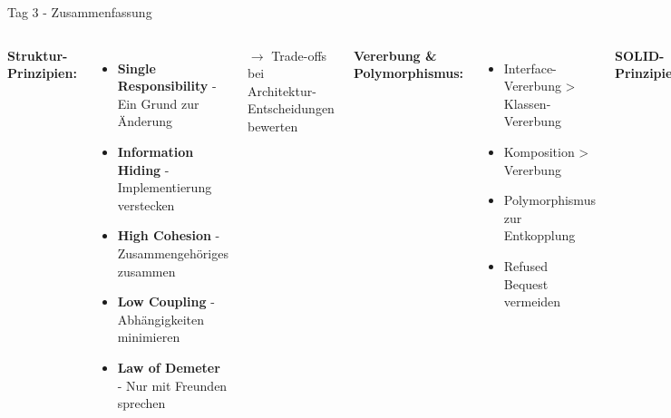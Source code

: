 \begin{frame}{Tag 3 - Zusammenfassung}
  \footnotesize
  \begin{columns}[T]
    \textbf{Struktur-Prinzipien:}
    \begin{itemize}
      \item \textbf{Single Responsibility} - Ein Grund zur Änderung
      \item \textbf{Information Hiding} - Implementierung verstecken
      \item \textbf{High Cohesion} - Zusammengehöriges zusammen
      \item \textbf{Low Coupling} - Abhängigkeiten minimieren
      \item \textbf{Law of Demeter} - Nur mit Freunden sprechen
    \end{itemize}

    $\rightarrow$ Trade-offs bei Architektur-Entscheidungen bewerten
    \vspace{0.5cm}

    \textbf{Vererbung \& Polymorphismus:}
    \begin{itemize}
      \item Interface-Vererbung > Klassen-Vererbung
      \item Komposition > Vererbung
      \item Polymorphismus zur Entkopplung
      \item Refused Bequest vermeiden
    \end{itemize}

    \textbf{SOLID-Prinzipien:}
    \begin{itemize}
      \item \textbf{Single Responsibility Principle} - \textit{Nochmal}
      \item \textbf{Open/Closed} - Erweiterbar, nicht änderbar
      \item \textbf{Liskov Substitution} - Subtypen austauschbar
      \item \textbf{Interface Segregation} - Kleine, fokussierte Interfaces
      \item \textbf{Dependency Inversion} - Auf Abstraktionen setzen
    \end{itemize}

    $\rightarrow$ Die jeweiligen Refactoring Strategien wissen
    \vspace{0.5cm}

    \textbf{Code Smells erkennen:}
    \begin{itemize}
      \item Large Class, Primitive Obsession
      \item Data Clumps, Divergent Change
      \item Shotgun Surgery, Feature Envy
      \item Message Chains
    \end{itemize}
  \end{columns}
\end{frame}
